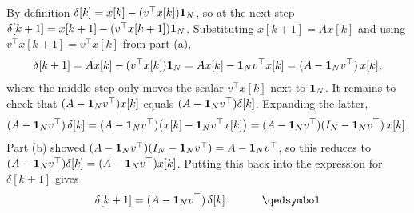 \documentclass[a4paper, 11pt]{article}
\begin{document}
\begin{solution}
By definition $\delta[k]=x[k]-(v^\top x[k])\mathbf{1}_N$, so at the next step $\delta[k+1]=x[k+1]-(v^\top x[k+1])\mathbf{1}_N$. Substituting $x[k+1]=Ax[k]$ and using $v^\top x[k+1]=v^\top x[k]$ from part (a),
\begin{align*}
    \delta[k+1] = Ax[k]-(v^\top x[k])\mathbf{1}_N = Ax[k]-\mathbf{1}_N v^\top x[k] = (A-\mathbf{1}_N v^\top)\,x[k],
\end{align*}
where the middle step only moves the scalar $v^\top x[k]$ next to $\mathbf{1}_N$. It remains to check that $(A-\mathbf{1}_N v^\top)x[k]$ equals $(A-\mathbf{1}_N v^\top)\delta[k]$. Expanding the latter,
\begin{align*}
    (A-\mathbf{1}_N v^\top)\,\delta[k] = (A-\mathbf{1}_N v^\top)\big(x[k]-\mathbf{1}_N v^\top x[k]\big) = (A-\mathbf{1}_N v^\top)(I_N-\mathbf{1}_N v^\top)\,x[k].
\end{align*}
Part (b) showed $(A-\mathbf{1}_N v^\top)(I_N-\mathbf{1}_N v^\top)=A-\mathbf{1}_N v^\top$, so this reduces to $(A-\mathbf{1}_N v^\top)\delta[k]=(A-\mathbf{1}_N v^\top)x[k]$. Putting this back into the expression for $\delta[k+1]$ gives
\begin{align*}
    \delta[k+1] = (A-\ones_N v^\top)\,\delta[k]. \qquad\qed
\end{align*}
\end{solution}
\problemend
\end{document}

